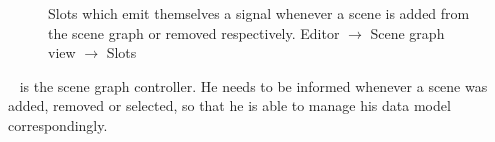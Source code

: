 \documentclass[%
    a4paper,    %
    justified,  %
    nobib,      %
    openany     %
]{tufte-book}
\begin{document}
\begin{figure}
\begin{flushleft}
\begin{minipage}{\linewidth}
\begin{list}{}{\setlength{\itemsep}{-\parsep}\setlength{\itemindent}{-\leftmargin}}
\item{}
\end{list}
\end{minipage}\vspace{4ex}
\end{flushleft}
\caption{Slots which emit themselves a signal whenever a scene is added from the
  scene graph or removed respectively.
  \newline{}\newline{}Editor $\rightarrow$ Scene graph view
  $\rightarrow$ Slots}
\label{editor:lst:scene-graph-view:slots:on-tree-item-added-removed}
\end{figure}

~ is the
scene graph controller. He needs to be informed whenever a scene was added,
removed or selected, so that he is able to manage his data model
correspondingly.
\end{document}
